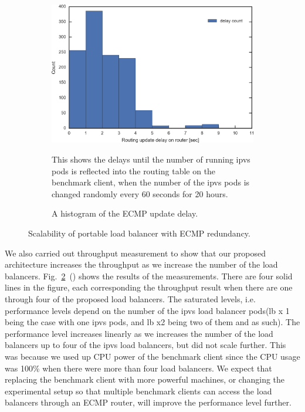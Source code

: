 \begin{figure}[t]
  \par\bigskip

  \begin{subfigure}[t]{\columnwidth}
    \includegraphics[width=0.9\columnwidth,left]{Figs/ecmp_delay_histgram_ieice}
  \caption{A histogram of the ECMP update delay.}
This shows the delays until the number of running ipvs pods is reflected into the routing table on the benchmark client,
when the number of the ipvs pods is changed randomly every 60 seconds for 20 hours.
    \label{fig:ecmp_delay_histgram_ieice}
  \end{subfigure}

  \caption{Scalability of portable load balancer with ECMP redundancy.}
  \label{fig:ecmp_scalability}

\end{figure}

We also carried out throughput measurement to show that our proposed architecture increases the throughput as we increase the number of the load balancers.
Fig.~\ref{fig:ecmp_scalability}~() shows the results of the measurements.
There are four solid lines in the figure, each corresponding the throughput result when there are one through four of the proposed load balancers.
The saturated levels, i.e. performance levels depend on the number of the ipvs load balancer pods(lb x 1 being the case with one ipvs pods, and lb x2 being two of them and as such). The performance level increases linearly as we increases the number of the load balancers up to four of the ipvs load balancers, but did not scale further.
This was because we used up CPU power of the benchmark client since the CPU usage was 100\% when there were more than four load balancers.
We expect that replacing the benchmark client with more powerful machines, or changing the experimental setup so that multiple benchmark clients can access the load balancers through an ECMP router, will improve the performance level further.

